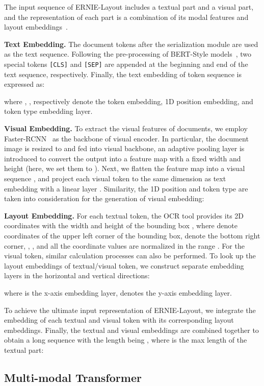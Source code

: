 \documentclass[11pt]{article}
\begin{document}
The input sequence of ERNIE-Layout includes a textual part and a visual part, and the representation of each part is a combination of its modal features and layout embeddings~\cite{xu2021layoutlmv2}.

\noindent\textbf{Text Embedding.}
The document tokens after the serialization module are used as the text sequence. 
Following the pre-processing of BERT-Style models~\cite{devlin2019bert}, two special tokens \verb|[CLS]| and \verb|[SEP]| are appended at the beginning and end of the text sequence, respectively. 
Finally, the text embedding of token sequence  is expressed as:

where , ,  respectively denote the token embedding, 1D position embedding, and token type embedding layer. 


\noindent\textbf{Visual Embedding.}
To extract the visual features of documents, we employ Faster-RCNN~\cite{ren2015faster} as the backbone of visual encoder.
In particular, the document image is resized to  and fed into visual backbone, an adaptive pooling layer is introduced to convert the output into a feature map with a fixed width  and height  (here, we set them to ).
Next, we flatten the feature map into a visual sequence , and project each visual token to the same dimension as text embedding with a linear layer . 
Similarity, the 1D position and token type  are taken into consideration for the generation of visual embedding:


\noindent\textbf{Layout Embedding.}
For each textual token, the OCR tool provides its 2D  coordinates with the width and height of the bounding box ,
where  denote coordinates of the upper left corner of the bounding box,  denote the bottom right corner, , , and all the coordinate values are normalized in the range .
For the visual token, similar calculation processes can also be performed.
To look up the layout embeddings of textual/visual token, we construct separate embedding layers in the horizontal and vertical directions:

where  is the x-axis embedding layer,  denotes the y-axis embedding layer.

To achieve the ultimate input representation  of ERNIE-Layout,
we integrate the embedding of each textual and visual token with its corresponding layout embeddings.
Finally, the textual and visual embeddings are combined together to obtain a long sequence with the length being , where  is the max length of the textual part:



\subsection{Multi-modal Transformer}
\label{sec:muti-modal-transformer}
\end{document}
